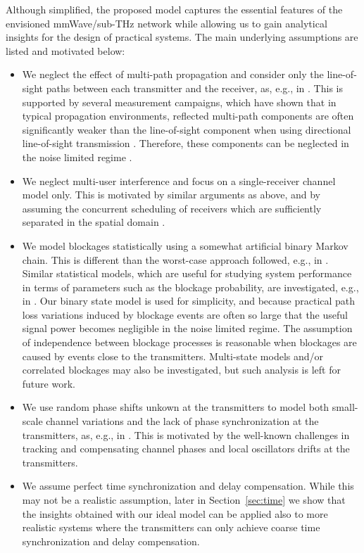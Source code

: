 \documentclass[10pt,journal,a4paper]{IEEEtran}
\begin{document}
Although simplified, the proposed model captures the essential features of the envisioned mmWave/sub-THz network while allowing us to gain analytical insights for the design of practical systems. The main underlying assumptions are listed and motivated below:
\begin{itemize}
\item We neglect the effect of multi-path propagation and consider only the line-of-sight paths between each transmitter and the receiver, as, e.g., in \cite{tuninetti2016coverage}. This is supported by several measurement campaigns, which have shown that in typical propagation environments, reflected multi-path components are often significantly weaker than the line-of-sight component when using directional line-of-sight transmission \cite{molish2022directionally,alper2023uniform,miretti2023little}. Therefore, these components can be neglected in the noise limited regime \cite{miretti2023little}.
\item We neglect multi-user interference and focus on a single-receiver channel model only. This is motivated by similar arguments as above, and by assuming the concurrent scheduling of receivers which are sufficiently separated in the spatial domain \cite{miretti2023little}.  
\item We model blockages statistically using a somewhat artificial binary Markov chain. This is different than the worst-case approach followed, e.g., in \cite{tolli2021blockage}. Similar statistical models, which are useful for studying system performance in terms of parameters such as the blockage probability, are investigated, e.g., in \cite{rappaport2017fading}. Our binary state model is used for simplicity, and because practical path loss variations induced by blockage events are often so large that the useful signal power becomes negligible in the noise limited regime. The assumption of independence between blockage processes \cite{rappaport2019diversity} is reasonable when blockages are caused by events close to the transmitters. Multi-state models and/or correlated blockages may also be investigated, but such analysis is left for future work.
\item We use random phase shifts unkown at the transmitters to model both small-scale channel variations and the lack of phase synchronization at the transmitters, as, e.g., in \cite{tuninetti2016coverage}. This is motivated by the well-known challenges in tracking and compensating channel phases and local oscillators drifts at the transmitters.
\item We assume perfect time synchronization and delay compensation. While this may not be a realistic assumption, later in Section~\ref{sec:time} we show that the insights obtained with our ideal model can be applied also to more realistic systems where the transmitters can only achieve coarse time synchronization and delay compensation. 
\end{itemize}
\end{document}
